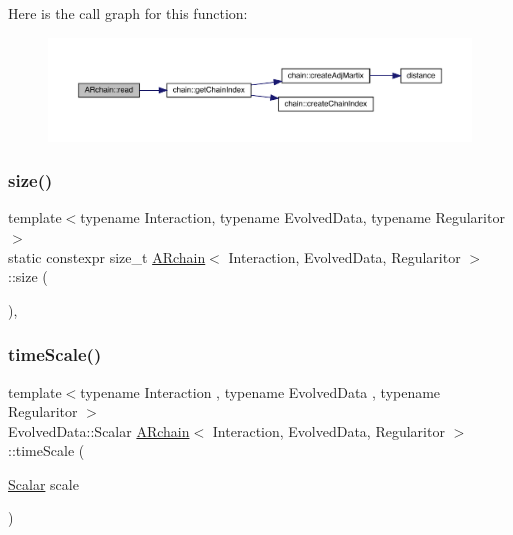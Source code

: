 Here is the call graph for this function\+:
\nopagebreak
\begin{figure}[H]
\begin{center}
\leavevmode
\includegraphics[width=350pt]{class_a_rchain_a86bd89bacf59c9c3bb0594499db82e04_cgraph}
\end{center}
\end{figure}
\mbox{\label{class_a_rchain_ac612af46ce057d56dc47a6d28738a4cf}} 
\subsubsection{\texorpdfstring{size()}{size()}}
{\footnotesize\ttfamily template$<$typename Interaction, typename Evolved\+Data, typename Regularitor$>$ \\
static constexpr size\+\_\+t \mbox{\hyperlink{class_a_rchain}{A\+Rchain}}$<$ Interaction, Evolved\+Data, Regularitor $>$\+::size (\begin{DoxyParamCaption}{ }\end{DoxyParamCaption})\hspace{0.3cm}{\ttfamily [inline]}, {\ttfamily [static]}}

\mbox{\label{class_a_rchain_a979a40abd086aeb411dc8e82a3bb1cdf}} 
\subsubsection{\texorpdfstring{time\+Scale()}{timeScale()}}
{\footnotesize\ttfamily template$<$typename Interaction , typename Evolved\+Data , typename Regularitor $>$ \\
Evolved\+Data\+::\+Scalar \mbox{\hyperlink{class_a_rchain}{A\+Rchain}}$<$ Interaction, Evolved\+Data, Regularitor $>$\+::time\+Scale (\begin{DoxyParamCaption}\item[{\mbox{\hyperlink{class_a_rchain_a707e42a79e4744424a34c9007e84ee07}{Scalar}}}]{scale }\end{DoxyParamCaption})}

